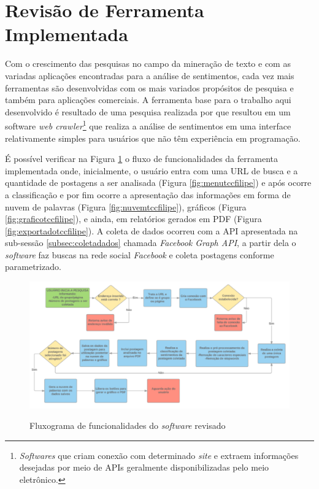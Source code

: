 \section{Revisão de Ferramenta Implementada}
\label{sec:revisaoferramenta}
Com o crescimento das pesquisas no campo da mineração de texto e com as variadas aplicações encontradas para a análise de sentimentos, cada vez mais ferramentas são desenvolvidas com os mais variados propósitos de pesquisa e também para aplicações comerciais. A ferramenta base para o trabalho aqui desenvolvido é resultado de uma pesquisa realizada por  que resultou em um software \textit{web crawler}\footnote{ \textit{Softwares} que criam conexão com determinado \textit{site} e extraem informações desejadas por meio de APIs geralmente disponibilizadas pelo meio eletrônico.} que realiza a análise de sentimentos em uma interface relativamente simples para usuários que não têm experiência em programação.

É possível verificar na Figura \ref{fig:fluxotccfilipe} o fluxo de funcionalidades da ferramenta implementada onde, inicialmente, o usuário entra com uma URL de busca e a quantidade de postagens a ser analisada (Figura \ref{fig:menutccfilipe}) e após ocorre a classificação e por fim ocorre a apresentação das informações em forma de nuvem de palavras (Figura \ref{fig:nuvemtccfilipe}), gráficos (Figura \ref{fig:graficotccfilipe}), e ainda, em relatórios gerados em PDF (Figura \ref{fig:exportadotccfilipe}). A coleta de dados ocorreu com a API apresentada na sub-sessão \ref{subsec:coletadados} chamada \textit{Facebook Graph API}, a partir dela o \textit{software} faz buscas na rede social \textit{Facebook} e coleta postagens conforme parametrizado.

\newpage

\begin{figure}[!h]
\centering 
\caption{Fluxograma de funcionalidades do \textit{software} revisado}
\includegraphics[scale=0.40]{imagens/fluxofilipe.png}
\label{fig:fluxotccfilipe}
\end{figure}

